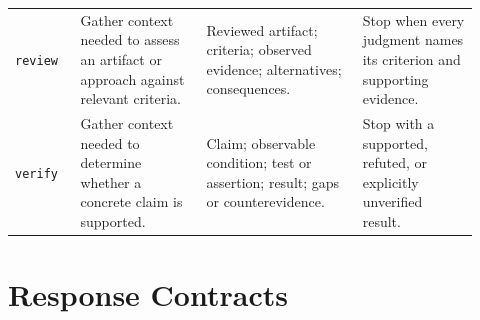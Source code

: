\begin{landscape}
\begin{longtable}{@{}L{0.13\linewidth}L{0.25\linewidth}L{0.31\linewidth}L{0.23\linewidth}@{}}
\texttt{review} & Gather context needed to assess an artifact or approach against relevant criteria. & Reviewed artifact; criteria; observed evidence; alternatives; consequences. & Stop when every judgment names its criterion and supporting evidence. \\
\texttt{verify} & Gather context needed to determine whether a concrete claim is supported. & Claim; observable condition; test or assertion; result; gaps or counterevidence. & Stop with a supported, refuted, or explicitly unverified result. \\
\end{longtable}
\endgroup
\end{landscape}

\section{Response Contracts}\label{sec:response-contracts}

